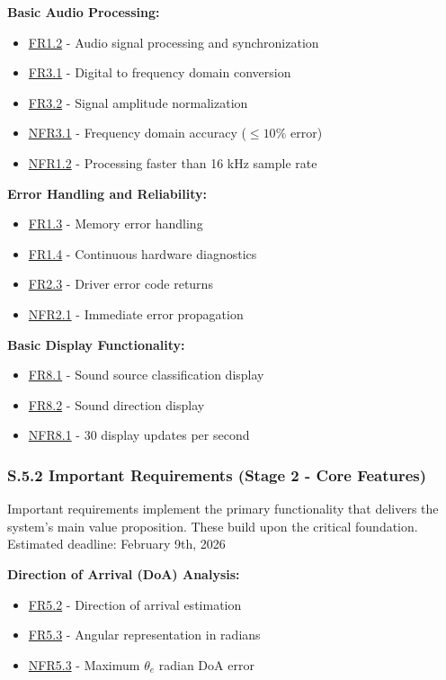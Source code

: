 \documentclass[12pt]{article}
\theoremstyle{definition}
\begin{document}
\textbf{Basic Audio Processing:}
\begin{itemize}
    \item \hyperref[FR1_2]{FR1.2} - Audio signal processing and synchronization
    \item \hyperref[FR3_1]{FR3.1} - Digital to frequency domain conversion
    \item \hyperref[FR3_2]{FR3.2} - Signal amplitude normalization
    \item \hyperref[NFR3_1]{NFR3.1} - Frequency domain accuracy ($\le 10\%$
    error)
    \item \hyperref[NFR1_2]{NFR1.2} - Processing faster than 16 kHz sample
    rate
\end{itemize}

\textbf{Error Handling and Reliability:}
\begin{itemize}
    \item \hyperref[FR1_3]{FR1.3} - Memory error handling
    \item \hyperref[FR1_4]{FR1.4} - Continuous hardware diagnostics
    \item \hyperref[FR2_3]{FR2.3} - Driver error code returns
    \item \hyperref[NFR2_1]{NFR2.1} - Immediate error propagation
\end{itemize}

\textbf{Basic Display Functionality:}
\begin{itemize}
    \item \hyperref[FR8_1]{FR8.1} - Sound source classification display
    \item \hyperref[FR8_2]{FR8.2} - Sound direction display
    \item \hyperref[NFR8_1]{NFR8.1} - 30 display updates per second
\end{itemize}

\subsubsection{S.5.2 Important Requirements (Stage 2 - Core Features)}

Important requirements implement the primary functionality that delivers the
system's main value proposition. These build upon the critical foundation. \\
\newline
Estimated deadline: February 9th, 2026 \\
\newline

\textbf{Direction of Arrival (DoA) Analysis:}
\begin{itemize}
    \item \hyperref[FR5_2]{FR5.2} - Direction of arrival estimation
    \item \hyperref[FR5_3]{FR5.3} - Angular representation in radians
    \item \hyperref[NFR5_3]{NFR5.3} - Maximum 
      \hyperref[symbol:theta_e]{$\theta_e$} radian DoA error
\end{itemize}
\end{document}
